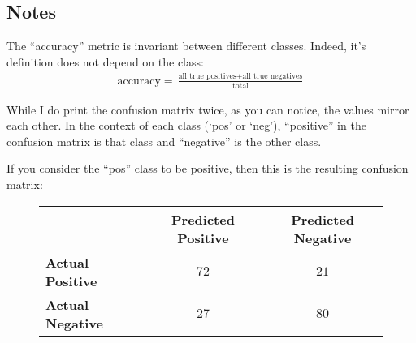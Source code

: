\subsection{Notes}

\begin{enumarabic}
  \item The ``accuracy'' metric is invariant between different classes.
    Indeed, it's definition does not depend on the class:
    \begin{align}
      \text{accuracy} = \frac{\text{all true positives} + \text{all true negatives}}{\text{total}}
    \end{align}
  \item While I do print the confusion matrix twice,
  as you can notice, the values mirror each other.
  In the context of each class (`pos' or `neg'),
  ``positive'' in the confusion matrix is that class and ``negative'' is the other class.
  
  If you consider the ``pos'' class to be positive,
  then this is the resulting confusion matrix:
  
  \begin{figure}[H]
    \begin{center}
      \begin{tabular}{l | c | c}
                                 & \textbf{Predicted Positive} & \textbf{Predicted Negative} \\
        \midrule
        \textbf{Actual Positive} & $72$ & $21$ \\
        \midrule
        \textbf{Actual Negative} & $27$ & $80$ \\
        \midrule     
      \end{tabular}
    \end{center}
  \end{figure}
\end{enumarabic}


